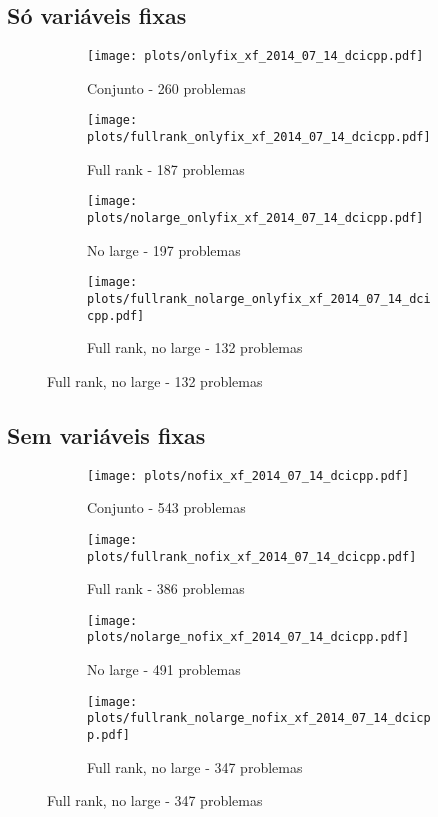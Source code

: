 \documentclass{article}
\begin{document}
\subsection{Só variáveis fixas}
\begin{figure}[H]
  \centering
  \begin{subfigure}{0.48\textwidth}
    \texttt{[image: plots/onlyfix\_xf\_2014\_07\_14\_dcicpp.pdf]}
    \caption{Conjunto - 260 problemas}
  \end{subfigure}
  \begin{subfigure}{0.48\textwidth}
    \texttt{[image: plots/fullrank\_onlyfix\_xf\_2014\_07\_14\_dcicpp.pdf]}
    \caption{Full rank - 187 problemas}
  \end{subfigure}
  \begin{subfigure}{0.48\textwidth}
    \texttt{[image: plots/nolarge\_onlyfix\_xf\_2014\_07\_14\_dcicpp.pdf]}
    \caption{No large - 197 problemas}
  \end{subfigure}
  \begin{subfigure}{0.48\textwidth}
    \texttt{[image: plots/fullrank\_nolarge\_onlyfix\_xf\_2014\_07\_14\_dcicpp.pdf]}
    \caption{Full rank, no large - 132 problemas}
  \end{subfigure}
\end{figure}

\subsection{Sem variáveis fixas}
\begin{figure}[H]
  \centering
  \begin{subfigure}{0.48\textwidth}
    \texttt{[image: plots/nofix\_xf\_2014\_07\_14\_dcicpp.pdf]}
    \caption{Conjunto - 543 problemas}
  \end{subfigure}
  \begin{subfigure}{0.48\textwidth}
    \texttt{[image: plots/fullrank\_nofix\_xf\_2014\_07\_14\_dcicpp.pdf]}
    \caption{Full rank - 386 problemas}
  \end{subfigure}
  \begin{subfigure}{0.48\textwidth}
    \texttt{[image: plots/nolarge\_nofix\_xf\_2014\_07\_14\_dcicpp.pdf]}
    \caption{No large - 491 problemas}
  \end{subfigure}
  \begin{subfigure}{0.48\textwidth}
    \texttt{[image: plots/fullrank\_nolarge\_nofix\_xf\_2014\_07\_14\_dcicpp.pdf]}
    \caption{Full rank, no large - 347 problemas}
  \end{subfigure}
\end{figure}
\end{document}
